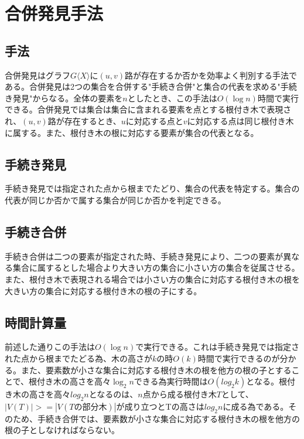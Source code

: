 \documentclass[twocolumn]{jarticle}
\begin{document}
\section{合併発見手法}
\subsection{手法}
合併発見はグラフ$G\langle X\rangle$に$(u,v)$路が存在するか否かを効率よく判別する手法である。合併発見は2つの集合を合併する"手続き合併"と集合の代表を求める"手続き発見"からなる。全体の要素を$n$としたとき、この手法は$O(\log n)$時間で実行できる。合併発見では集合は集合に含まれる要素を点とする根付き木で表現され、$(u,v)$路が存在するとき、$u$に対応する点と$v$に対応する点は同じ根付き木に属する。また、根付き木の根に対応する要素が集合の代表となる。
\subsection{手続き発見}
手続き発見では指定された点から根までたどり、集合の代表を特定する。集合の代表が同じか否かで属する集合が同じか否かを判定できる。
\subsection{手続き合併}
手続き合併は二つの要素が指定された時、手続き発見により、二つの要素が異なる集合に属するとした場合より大きい方の集合に小さい方の集合を従属させる。また、根付き木で表現される場合では小さい方の集合に対応する根付き木の根を大きい方の集合に対応する根付き木の根の子にする。
\subsection{時間計算量}
前述した通りこの手法は$O(\log n)$で実行できる。これは手続き発見では指定された点から根までたどる為、木の高さが$k$の時$O(k)$時間で実行できるのが分かる。また、要素数が小さな集合に対応する根付き木の根を他方の根の子とすることで、根付き木の高さを高々$\log_2 n$できる為実行時間は$O(log_2 k)$となる。根付き木の高さを高々$log_2 n$となるのは、$n$点から成る根付き木$T$として、$|V(T)|>=|V(Tの部分木)|$が成り立つとTの高さは$log_2 n$に成る為である。そのため、手続き合併では、要素数が小さな集合に対応する根付き木の根を他方の根の子としなければならない。
\end{document}
